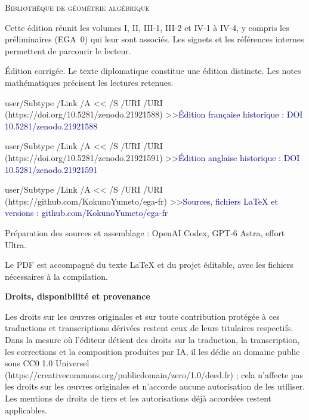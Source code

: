 \documentclass[11pt,a4paper]{article}
\newcommand{\editionlink}[2]{\leavevmode\pdfstartlink user{/Subtype /Link /A << /S /URI /URI (#1) >>}\textcolor{navy}{#2}\pdfendlink}
\begin{document}
\color{navy}
\noindent\textsc{Bibliothèque de géométrie algébrique}\par
\vspace{22mm}
\par
\vspace{9mm}
\par
\vspace{18mm}
\par
\vspace{3mm}
\par
\vspace{10mm}
\color{muted}
\noindent Cette édition réunit les volumes I, II, III-1, III-2 et IV-1 à IV-4,
y compris les préliminaires (EGA~0) qui leur sont associés.
Les signets et les références internes permettent de parcourir le lecteur.\par
\vspace{5mm}
\noindent Édition corrigée. Le texte diplomatique constitue une édition
distincte. Les notes mathématiques précisent les lectures retenues.\par
\vspace{9mm}
\noindent\editionlink{https://doi.org/10.5281/zenodo.21921588}{Édition française historique : DOI 10.5281/zenodo.21921588}\par
\vspace{3mm}
\noindent\editionlink{https://doi.org/10.5281/zenodo.21921591}{Édition anglaise historique : DOI 10.5281/zenodo.21921591}\par
\vspace{3mm}
\noindent\editionlink{https://github.com/KokunoYumeto/ega-fr}{Sources, fichiers LaTeX et versions : github.com/KokunoYumeto/ega-fr}\par
\vfill
\small
\noindent Préparation des sources et assemblage : OpenAI Codex,
GPT-6 Astra, effort Ultra.\par
\vspace{3mm}
\noindent Le PDF est accompagné du texte LaTeX et du projet éditable,
avec les fichiers nécessaires à la compilation.\par

\clearpage
\begingroup
\small
\noindent\textbf{Droits, disponibilité et provenance}

Les droits sur les œuvres originales et sur toute contribution protégée à ces traductions et transcriptions dérivées restent ceux de leurs titulaires respectifs. Dans la mesure où l'éditeur détient des droits sur la traduction, la transcription, les corrections et la composition produites par IA, il les dédie au domaine public sous CC0 1.0 Universel (https://creativecommons.org/publicdomain/zero/1.0/deed.fr) ; cela n'affecte pas les droits sur les œuvres originales et n'accorde aucune autorisation de les utiliser. Les mentions de droits de tiers et les autorisations déjà accordées restent applicables.
\end{document}
